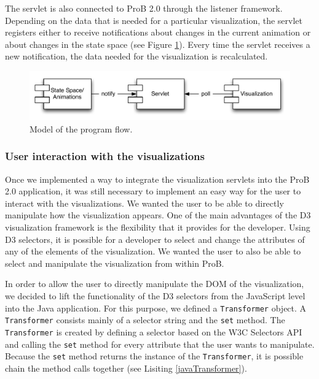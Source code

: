 The servlet is also connected to ProB 2.0 through the listener framework. Depending on the data that is needed for a particular visualization, the servlet registers either to receive notifications about changes in the current animation or about changes in the state space (see Figure \ref{programFlow}). Every time the servlet receives a new notification, the data needed for the visualization is recalculated.

\begin{center}
\begin{figure}[h!]
\includegraphics[width=14cm]{bilder/programFlow.pdf}
\caption{Model of the program flow.}
\label{programFlow}
\end{figure}
\end{center}

\subsubsection{User interaction with the visualizations}

Once we implemented a way to integrate the visualization servlets into the ProB 2.0 application, it was still necessary to implement an easy way for the user to interact with the visualizations. We wanted the user to be able to directly manipulate how the visualization appears. One of the main advantages of the D3 visualization framework is the flexibility that it provides for the developer. Using D3 selectors, it is possible for a developer to select and change the attributes of any of the elements of the visualization. We wanted the user to also be able to select and manipulate the visualization from within ProB. 

In order to allow the user to directly manipulate the DOM of the visualization, we decided to lift the functionality of the D3 selectors from the JavaScript level into the Java application. For this purpose, we defined a \texttt{Transformer} object. A \texttt{Transformer} consists mainly of a selector string and the \texttt{set} method. The \texttt{Transformer} is created by defining a selector based on the W3C Selectors API and calling the \texttt{set} method for every attribute that the user wants to manipulate. Because the \texttt{set} method returns the instance of the \texttt{Transformer}, it is possible chain the method calls together (see Lisiting \ref{javaTransformer}).

